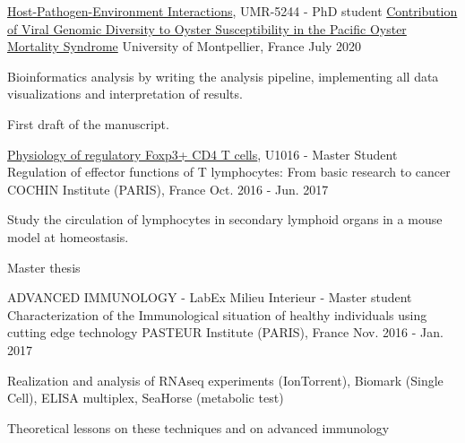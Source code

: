 

\begin{cventries}

  \cventry
    {\href{http://ihpe.univ-perp.fr/en/}{Host-Pathogen-Environment Interactions}, UMR-5244 - PhD student} %
    {\href{https://doi.org/10.3389/fmicb.2020.01579}{Contribution of Viral Genomic Diversity to Oyster Susceptibility in the Pacific Oyster Mortality Syndrome}} %
    {University of Montpellier, France} %
    {July 2020} %
    {
      \begin{cvitems} %
        \item {Bioinformatics analysis by writing the analysis pipeline, implementing all data visualizations and interpretation of results.}
        \item {First draft of the manuscript.}
      \end{cvitems}
    }

  \cventry
    {\href{https://www.institutcochin.fr/departments/3i/team-lucas/physiology-of-regulatory-foxp3-cd4-t-cells}{Physiology of regulatory Foxp3+ CD4 T cells}, U1016 - Master Student}%
    {Regulation of effector functions of T lymphocytes: From basic research to cancer} %
    {COCHIN Institute (PARIS), France} %
    {Oct. 2016 - Jun. 2017} %
    {
      \begin{cvitems} %
        \item {Study the circulation of lymphocytes in secondary lymphoid organs in a mouse model at homeostasis.}
        \item {Master thesis}
      \end{cvitems}
    }

  \cventry
    {ADVANCED IMMUNOLOGY - LabEx Milieu Interieur - Master student} %
    {Characterization of the Immunological situation of healthy individuals using cutting edge technology} %
    {PASTEUR Institute (PARIS), France} %
    {Nov. 2016 - Jan. 2017} %
    {
      \begin{cvitems} %
        \item {Realization and analysis of RNAseq experiments (IonTorrent), Biomark (Single Cell), ELISA multiplex, SeaHorse (metabolic test)}
        \item {Theoretical lessons on these techniques and on advanced immunology}
      \end{cvitems}
    }


\end{cventries}
